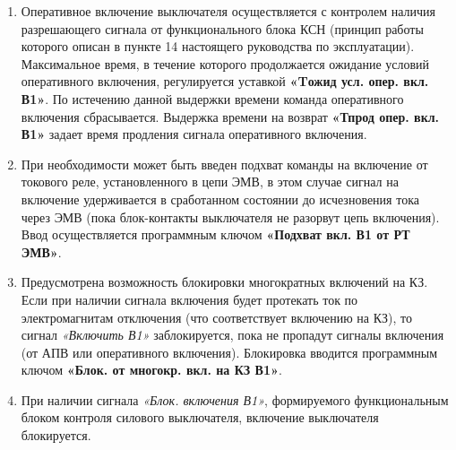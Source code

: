 \begin{enumerate}[label=\arabic{section}.\arabic{subsection}.\arabic{enumi}, labelsep=4pt, leftmargin=0pt, itemindent=57pt, itemsep=0pt, parsep=0pt]
\item
Оперативное включение выключателя осуществляется с контролем наличия разрешающего сигнала от функционального блока КСН (принцип работы которого описан в пункте 14 настоящего руководства по эксплуатации). Максимальное время, в течение которого продолжается ожидание условий оперативного включения, регулируется уставкой \textbf{«Tожид усл. опер. вкл. В1»}. По истечению данной выдержки времени команда оперативного включения сбрасывается. Выдержка времени на возврат \textbf{«Тпрод опер. вкл. В1»} задает время продления сигнала оперативного включения.

\item
При необходимости может быть введен подхват команды на включение от токового реле, установленного в цепи ЭМВ, в этом случае сигнал на включение удерживается в сработанном состоянии до исчезновения тока через ЭМВ (пока блок-контакты выключателя не разорвут цепь включения). Ввод осуществляется программным ключом \textbf{«Подхват вкл. В1 от РТ ЭМВ»}. 

\item
Предусмотрена возможность блокировки многократных включений на КЗ. Если при наличии сигнала включения будет протекать ток по электромагнитам отключения (что соответствует включению на КЗ), то сигнал \textit{«Включить В1»} заблокируется, пока не пропадут сигналы включения (от АПВ или оперативного включения). Блокировка вводится программным ключом \textbf{«Блок. от многокр. вкл. на КЗ В1»}.

\item
При наличии сигнала \textit{«Блок. включения В1»}, формируемого функциональным блоком контроля силового выключателя, включение выключателя блокируется.


\end{enumerate}